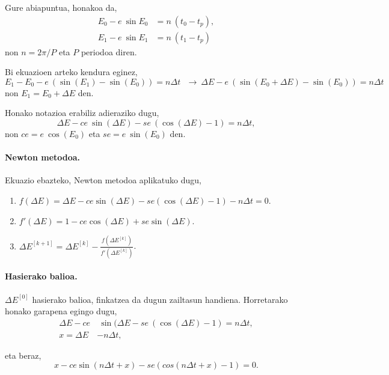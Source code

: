 Gure abiapuntua, honakoa da,
\begin{align*}
E_0-e \ \sin E_0 & =n \ (t_0-t_p), \\
E_1-e \ \sin E_1 & =n \ (t_1-t_p)
\end{align*}
non $n=2\pi/P$ eta $P$ periodoa diren.

Bi ekuazioen arteko kendura eginez,
\begin{equation*}
E_1-E_0-e \ (\sin(E_1)-\sin(E_0))=n \Delta t \ \ \ \longrightarrow \ \Delta E - e \ (\sin(E_0+\Delta E)-\sin(E_0))=n \Delta t
\end{equation*}
non $E_1=E_0+\Delta E$ den.  

Honako notazioa erabiliz adieraziko dugu,
\begin{equation*}
\Delta E - ce \ \sin(\Delta E)- se \ (\cos(\Delta E)-1)=n \Delta t,
\end{equation*}
non $ce=e \ \cos(E_0)$ eta $se=e \ \sin(E_0)$ den.

\paragraph*{Newton metodoa.}Ekuazio ebazteko, Newton metodoa aplikatuko dugu,

\begin{enumerate}
\item $f(\Delta E)=\Delta E - ce \sin(\Delta E)- se (\cos(\Delta E)-1)-n \Delta t=0$.

\item $f'(\Delta E)=1-ce \cos(\Delta E)+ se \sin(\Delta E)$.

\item $\Delta E^{[k+1]}=\Delta E^{[k]}- \frac{f(\Delta E^{[k]})}{f'(\Delta E^{[k]})}$.

\end{enumerate}

\paragraph*{Hasierako balioa.} $\Delta E^{[0]}$ hasierako balioa, finkatzea da dugun zailtasun handiena. Horretarako honako garapena egingo dugu,
\begin{align*}
\Delta E - ce& \ \sin(\Delta E- se \ (\cos(\Delta E)-1)=n \Delta t, \\
x= \Delta E &- n \Delta t,
\end{align*}

eta beraz,
\begin{equation*}
x-ce \sin(n\Delta t+x)-se(cos(n \Delta t+x)-1)=0.
\end{equation*}

